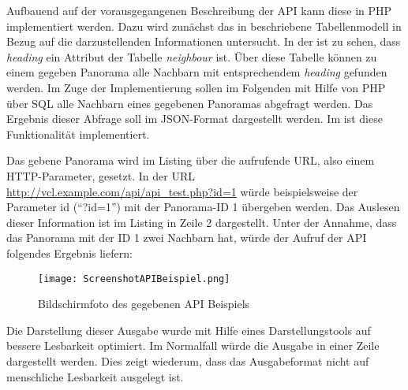 
Aufbauend auf der vorausgegangenen Beschreibung der API kann diese in PHP
implementiert werden. Dazu wird zunächst das in 
beschriebene Tabellenmodell in Bezug auf die darzustellenden Informationen
untersucht. In der  ist zu sehen, dass
\textit{heading} ein Attribut der Tabelle \textit{neighbour} ist. Über diese
Tabelle können zu einem gegeben Panorama alle Nachbarn mit entsprechendem
\textit{heading} gefunden werden.
Im Zuge der Implementierung sollen im Folgenden mit Hilfe von PHP über SQL alle
Nachbarn eines gegebenen Panoramas abgefragt werden. Das Ergebnis dieser
Abfrage soll im JSON-Format dargestellt werden. Im 
ist diese Funktionalität implementiert.

\clearpage



Das gebene Panorama wird im Listing über die aufrufende URL, also einem
HTTP\footnotemark -Parameter, gesetzt. In der URL
\url{http://vcl.example.com/api/api\_test.php?id=1} würde beispielsweise der
Parameter id ("`?id=1"') mit der Panorama-ID 1 übergeben werden. Das
Auslesen dieser Information ist im Listing in Zeile 2 dargestellt.
Unter der Annahme, dass das Panorama mit der ID 1 zwei Nachbarn hat, würde der
Aufruf der API folgendes Ergebnis liefern:


\begin{figure}[htb]
\centering
\texttt{[image: ScreenshotAPIBeispiel.png]}
\caption[API Beispiel]{Bildschirmfoto des gegebenen API Beispiels}
\label{fig:ScreenshotAPIBeispiel}
\end{figure}

Die Darstellung dieser Ausgabe wurde mit Hilfe eines Darstellungstools auf
bessere Lesbarkeit optimiert. Im Normalfall würde die Ausgabe in einer Zeile
dargestellt werden. Dies zeigt wiederum, dass das Ausgabeformat nicht auf
menschliche Lesbarkeit ausgelegt ist.

